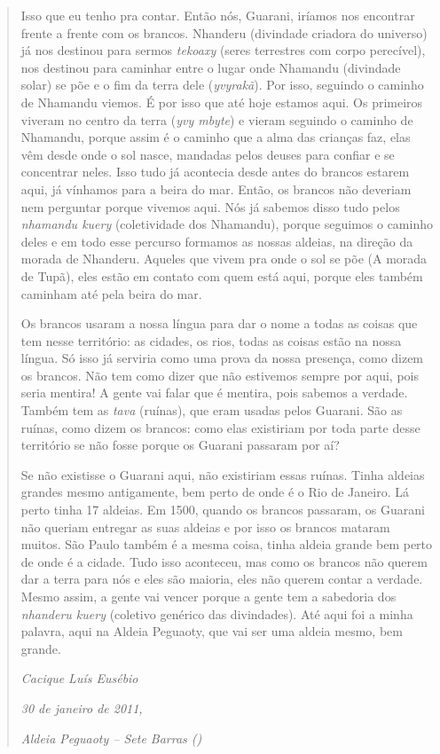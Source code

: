 \begin{quotation}
Isso que eu tenho pra contar. Então nós, Guarani, iríamos nos encontrar
frente a frente com os brancos. Nhanderu (divindade criadora do
universo) já nos destinou para sermos \emph{tekoaxy} (seres terrestres com
corpo perecível), nos destinou para caminhar entre o lugar onde
Nhamandu (divindade solar) se põe e o fim da terra dele
(\emph{yvyrakã}). Por isso, seguindo o caminho de Nhamandu viemos. É por isso
que até hoje estamos aqui. Os primeiros viveram no centro da terra (\emph{yvy
mbyte}) e vieram seguindo o caminho de Nhamandu, porque assim é o caminho
que a alma das crianças faz, elas vêm desde onde o sol nasce, mandadas
pelos deuses para confiar e se concentrar neles. Isso tudo já acontecia
desde antes do brancos estarem aqui, já vínhamos para a beira do mar.
Então, os brancos não deveriam nem perguntar porque vivemos aqui. Nós
já sabemos disso tudo pelos \emph{nhamandu kuery} (coletividade dos Nhamandu),
porque seguimos o caminho deles e em todo esse percurso formamos as
nossas aldeias, na direção da morada de Nhanderu. Aqueles que vivem pra
onde o sol se põe (A morada de Tupã), eles estão em contato com
quem está aqui, porque eles também caminham até pela beira do mar. 

Os brancos usaram a nossa língua para dar o nome a todas as coisas que
tem nesse território: as cidades, os rios, todas as coisas estão na
nossa língua. Só isso já serviria como uma prova da nossa presença,
como dizem os brancos. Não tem como dizer que não estivemos sempre por
aqui, pois seria mentira! A gente vai falar que é mentira, pois sabemos a
verdade. Também tem as \emph{tava} (ruínas), que eram usadas pelos Guarani.
São as ruínas, como dizem os brancos: como elas existiriam por toda
parte desse território se não fosse porque os Guarani passaram por aí? 

Se não existisse o Guarani aqui, não existiriam essas ruínas. Tinha
aldeias grandes mesmo antigamente, bem perto de onde é o Rio de
Janeiro. Lá perto tinha 17 aldeias. Em 1500, quando os brancos
passaram, os Guarani não queriam entregar as suas aldeias e por isso os
brancos mataram muitos. São Paulo também é a mesma coisa, tinha aldeia
grande bem perto de onde é a cidade. Tudo isso aconteceu, mas como os
brancos não querem dar a terra para nós e eles são maioria, eles não
querem contar a verdade. Mesmo assim, a gente vai vencer porque a gente
tem a sabedoria dos \emph{nhanderu kuery} (coletivo genérico das divindades).
Até aqui foi a minha palavra, aqui na Aldeia Peguaoty, que vai ser uma
aldeia mesmo, bem grande.
\medskip
\begin{flushright}
\emph{Cacique Luís Eusébio}

\emph{30 de janeiro de 2011,}

\emph{Aldeia Peguaoty – Sete Barras ()}

\end{flushright}
\end{quotation}

